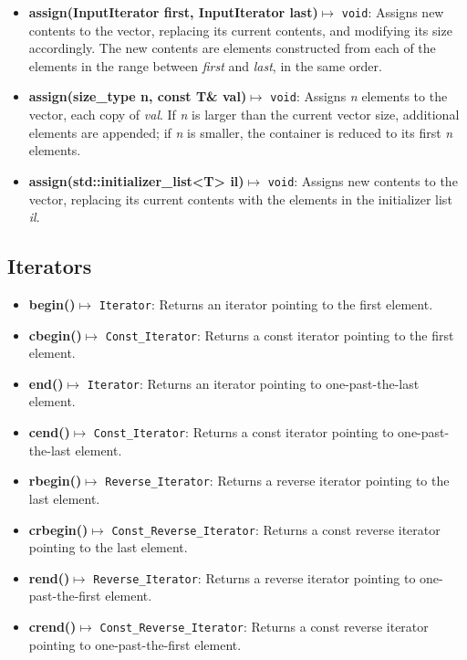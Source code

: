 \documentclass{report}
\begin{document}
\begin{itemize}
        \item \textbf{assign(InputIterator first, InputIterator last)}$\mapsto$ \texttt{void}: Assigns new contents to the vector, replacing its current contents, and modifying its size accordingly. The new contents are elements constructed from each of the elements in the range between \textit{first} and \textit{last}, in the same order.
        \item \textbf{assign(size\_type n, const T\& val)}$\mapsto$ \texttt{void}: Assigns \textit{n} elements to the vector, each copy of \textit{val}. If \textit{n} is larger than the current vector size, additional elements are appended; if \textit{n} is smaller, the container is reduced to its first \textit{n} elements.
        \item \textbf{assign(std::initializer\_list<T> il)}$\mapsto$ \texttt{void}: Assigns new contents to the vector, replacing its current contents with the elements in the initializer list \textit{il}.
    \end{itemize}

    \bigbreak \noindent 
    \subsection{Iterators}
    \bigbreak \noindent 
    \begin{itemize}
        \item \textbf{begin()}\(\mapsto\) \texttt{Iterator}: Returns an iterator pointing to the first element.
        \item \textbf{cbegin()}\(\mapsto\) \texttt{Const\_Iterator}: Returns a const iterator pointing to the first element.
        \item \textbf{end()}\(\mapsto\) \texttt{Iterator}: Returns an iterator pointing to one-past-the-last element.
        \item \textbf{cend()}\(\mapsto\) \texttt{Const\_Iterator}: Returns a const iterator pointing to one-past-the-last element.
        \item \textbf{rbegin()}\(\mapsto\) \texttt{Reverse\_Iterator}: Returns a reverse iterator pointing to the last element.
        \item \textbf{crbegin()}\(\mapsto\) \texttt{Const\_Reverse\_Iterator}: Returns a const reverse iterator pointing to the last element.
        \item \textbf{rend()}\(\mapsto\) \texttt{Reverse\_Iterator}: Returns a reverse iterator pointing to one-past-the-first element.
        \item \textbf{crend()}\(\mapsto\) \texttt{Const\_Reverse\_Iterator}: Returns a const reverse iterator pointing to one-past-the-first element.
    \end{itemize}
\end{document}
